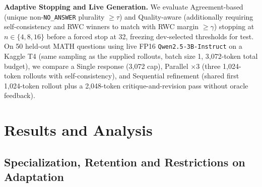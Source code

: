 \documentclass{article}
\begin{document}
\textbf{Adaptive Stopping and Live Generation.} We evaluate Agreement-based (unique non-\texttt{NO\_ANSWER} plurality $\ge \tau$) and Quality-aware (additionally requiring self-consistency and RWC winners to match with RWC margin $\ge \gamma$) stopping \citep{aggarwal2023adaptiveconsistency} at $n \in \{4, 8, 16\}$ before a forced stop at 32, freezing dev-selected thresholds for test. On 50 held-out MATH questions using live FP16 \texttt{Qwen2.5-\allowbreak 3B-\allowbreak Instruct} on a Kaggle T4 (same sampling as the supplied rollouts, batch size 1, 3,072-token total budget), we compare a Single response (3,072 cap), Parallel $\times 3$ (three 1,024-token rollouts with self-consistency), and Sequential refinement \citep{madaan2023selfrefine} (shared first 1,024-token rollout plus a 2,048-token critique-and-revision pass without oracle feedback).

\section{Results and Analysis}
\label{sec:results}

\subsection{Specialization, Retention and Restrictions on Adaptation}
\label{sec:results-finetuning}
\end{document}
